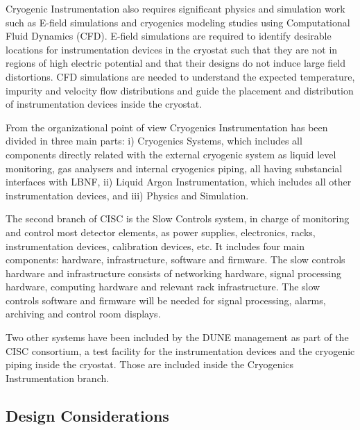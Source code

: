 Cryogenic Instrumentation also requires significant physics and
simulation work such as E-field simulations and cryogenics modeling
studies using Computational Fluid Dynamics (CFD). E-field simulations
are required to identify desirable locations for instrumentation
devices in the cryostat such that they are not in regions of high electric potential and
that their designs do not induce large field distortions. CFD
simulations are needed to understand the expected temperature,
impurity and velocity flow distributions and guide the placement and
distribution of instrumentation devices inside the cryostat.

From the organizational point of view
Cryogenics Instrumentation has been divided in three main parts: i) Cryogenics Systems, which includes all components directly related with the external cryogenic system as
liquid level monitoring, gas analysers and internal cryogenics piping, all having substancial interfaces with LBNF, ii) Liquid Argon Instrumentation, which includes all
other instrumentation devices, and iii) Physics and Simulation.


The second branch of CISC is the Slow Controls system, in charge of monitoring and control most detector elements, as power supplies, electronics, racks, instrumentation devices,
calibration devices, etc. It includes four main components: hardware, infrastructure,
software and firmware. The slow controls hardware and infrastructure consists of
networking hardware, signal processing hardware, computing hardware and relevant
rack infrastructure. The slow controls software and firmware will be needed for
signal processing, alarms, archiving and control room displays.

Two other systems have been included by the DUNE management as part of the CISC consortium,
a test facility for the instrumentation devices and the cryogenic piping inside the cryostat.
Those are included inside the Cryogenics Instrumentation branch. 



\subsection{Design Considerations}
\label{sec:fdsp-slow-cryo-des-consid}

